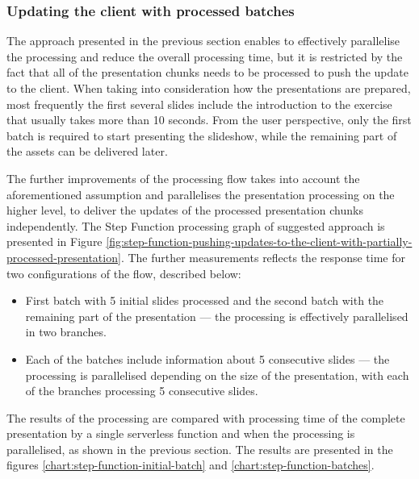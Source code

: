 \subsubsection{Updating the client with processed batches} \label{section:case-study-updating-the-client-with-processed-batch}

The approach presented in the previous section enables to effectively parallelise the processing and reduce the overall processing time, but it is restricted by the fact that all of the presentation chunks needs to be processed to push the update to the client. When taking into consideration how the presentations are prepared, most frequently the first several slides include the introduction to the exercise that usually takes more than 10 seconds. From the user perspective, only the first batch is required to start presenting the slideshow, while the remaining part of the assets can be delivered later.

The further improvements of the processing flow takes into account the aforementioned assumption and parallelises the presentation processing on the higher level, to deliver the updates of the processed presentation chunks independently. The Step Function processing graph of suggested approach is presented in Figure \ref{fig:step-function-pushing-updates-to-the-client-with-partially-processed-presentation}. The further measurements reflects the response time for two configurations of the flow, described below:

\begin{itemize}
   \item First batch with 5 initial slides processed and the second batch with the remaining part of the presentation --- the processing is effectively parallelised in two branches.
   \item Each of the batches include information about 5 consecutive slides --- the processing is parallelised depending on the size of the presentation, with each of the branches processing 5 consecutive slides.
\end{itemize}

The results of the processing are compared with processing time of the complete presentation by a single serverless function and when the processing is parallelised, as shown in the previous section. The results are presented in the figures \ref{chart:step-function-initial-batch} and \ref{chart:step-function-batches}.

